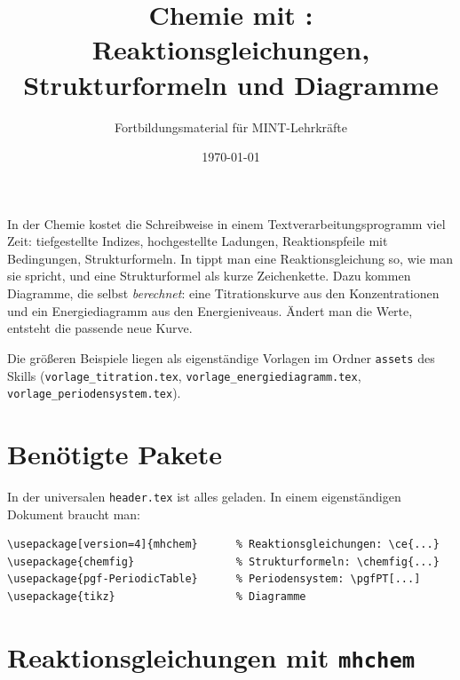 



\title{Chemie mit : Reaktionsgleichungen, Strukturformeln und Diagramme}
\author{Fortbildungsmaterial für MINT-Lehrkräfte}
\date{\today}
\pagestyle{plain}
\setlength{\parskip}{1.5em} %
\setlength{\emergencystretch}{4em} %




\maketitle

In der Chemie kostet die Schreibweise in einem Textverarbeitungsprogramm viel Zeit: tiefgestellte Indizes, hochgestellte Ladungen, Reaktionspfeile mit Bedingungen, Strukturformeln. In  tippt man eine Reaktionsgleichung so, wie man sie spricht, und eine Strukturformel als kurze Zeichenkette. Dazu kommen Diagramme, die  selbst \textit{berechnet}: eine Titrationskurve aus den Konzentrationen und ein Energiediagramm aus den Energieniveaus. Ändert man die Werte, entsteht die passende neue Kurve.

Die größeren Beispiele liegen als eigenständige Vorlagen im Ordner \texttt{assets} des Skills (\texttt{vorlage\_titration.tex}, \texttt{vorlage\_energiediagramm.tex}, \texttt{vorlage\_periodensystem.tex}).

\tableofcontents



\section{Benötigte Pakete}

In der universalen \texttt{header.tex} ist alles geladen. In einem eigenständigen Dokument braucht man:

\begin{lstlisting}[style=latex]
\usepackage[version=4]{mhchem}      % Reaktionsgleichungen: \ce{...}
\usepackage{chemfig}                % Strukturformeln: \chemfig{...}
\usepackage{pgf-PeriodicTable}      % Periodensystem: \pgfPT[...]
\usepackage{tikz}                   % Diagramme
\end{lstlisting}



\section{Reaktionsgleichungen mit \texttt{mhchem}}

